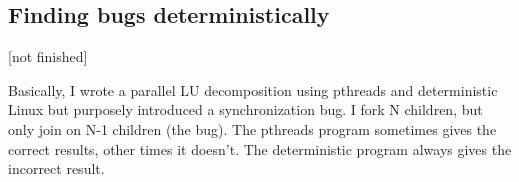 \subsection{Finding bugs deterministically}

[not finished]

Basically, I wrote a parallel LU decomposition using pthreads and deterministic
Linux but purposely introduced a synchronization bug. I fork N children, but
only join on N-1 children (the bug). The pthreads program sometimes gives the
correct results, other times it doesn't. The deterministic program always gives
the incorrect result.

\endinput

